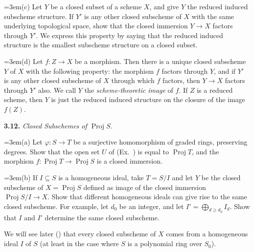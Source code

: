 {\noindent\hangindent=3em\hspace*{1.7em}(c) Let $Y$ be a closed subset of a scheme $X$, and give $Y$ the reduced induced subscheme structure. If $Y'$ is any other closed subscheme of $X$ with the same underlying topological space, show that the closed immersion $Y\to X$ factors through $Y'$. We express this property by saying that the reduced induced structure is the smallest subscheme structure on a closed subset.

\noindent\hangindent=3em\hspace*{1.7em}(d) Let $f\colon Z\to X$ be a morphism. Then there is a unique closed subscheme $Y$ of $X$ with the following property: the morphism $f$ factors through $Y$, and if $Y'$ is any other closed subscheme of $X$ through which $f$ factors, then $Y\to X$ factors through $Y'$ also. We call $Y$ the \emph{scheme-theoretic image} of $f$. If $Z$ is a reduced scheme, then $Y$ is just the reduced induced structure on the closure of the image $f(Z)$.

\smallskip
\noindent\hypertarget{ex-II-3.12}{}\textbf{3.12.} \emph{Closed Subschemes of $\operatorname{Proj} S$.}

\noindent\hangindent=3em\hspace*{1.7em}(a) Let $\varphi\colon S\to T$ be a surjective homomorphism of graded rings, preserving degrees. Show that the open set $U$ of (Ex.~) is equal to $\operatorname{Proj} T$, and the morphism $f\colon \operatorname{Proj} T\to\operatorname{Proj} S$ is a closed immersion.

\noindent\hangindent=3em\hspace*{1.7em}(b) If $I\subseteq S$ is a homogeneous ideal, take $T=S/I$ and let $Y$ be the closed subscheme of $X=\operatorname{Proj} S$ defined as image of the closed immersion $\operatorname{Proj} S/I\to X$. Show that different homogeneous ideals can give rise to the same closed subscheme. For example, let $d_0$ be an integer, and let $I'=\bigoplus_{d\ge d_0} I_d$. Show that $I$ and $I'$ determine the same closed subscheme.

We will see later () that every closed subscheme of $X$ comes from a homogeneous ideal $I$ of $S$ (at least in the case where $S$ is a polynomial ring over $S_0$).}
